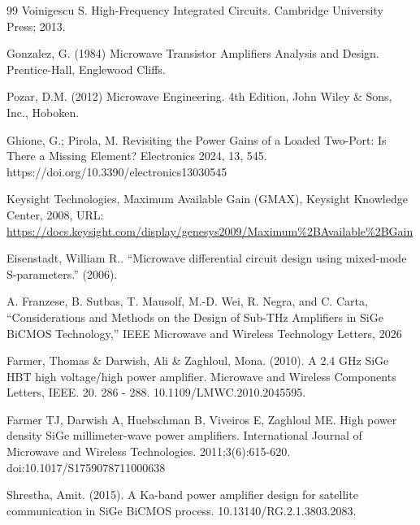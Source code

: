 \begin{thebibliography}{99}
Voinigescu S. High-Frequency Integrated Circuits. Cambridge University Press; 2013.

Gonzalez, G. (1984) Microwave Transistor Amplifiers Analysis and Design. Prentice-Hall, Englewood Cliffs.

Pozar, D.M. (2012) Microwave Engineering. 4th Edition, John Wiley & Sons, Inc., Hoboken.

Ghione, G.; Pirola, M. Revisiting the Power Gains of a Loaded Two-Port: Is There a Missing Element? Electronics 2024, 13, 545. https://doi.org/10.3390/electronics13030545

Keysight Technologies, Maximum Available Gain (GMAX), Keysight Knowledge Center, 2008, URL: \url{https://docs.keysight.com/display/genesys2009/Maximum%2BAvailable%2BGain}

Eisenstadt, William R.. “Microwave differential circuit design using mixed-mode S-parameters.” (2006).

 A. Franzese, B. Sutbas, T. Mausolf, M.-D. Wei, R. Negra, and C. Carta, “Considerations and Methods on the Design of Sub-THz Amplifiers in SiGe BiCMOS Technology,” IEEE Microwave and Wireless Technology Letters, 2026


Farmer, Thomas \& Darwish, Ali \& Zaghloul, Mona. (2010). A 2.4 GHz SiGe HBT high voltage/high power amplifier. Microwave and Wireless Components Letters, IEEE. 20. 286 - 288. 10.1109/LMWC.2010.2045595.


Farmer TJ, Darwish A, Huebschman B, Viveiros E, Zaghloul ME. High power density SiGe millimeter-wave power amplifiers. International Journal of Microwave and Wireless Technologies. 2011;3(6):615-620. doi:10.1017/S1759078711000638


Shrestha, Amit. (2015). A Ka-band power amplifier design for satellite communication in SiGe BiCMOS process. 10.13140/RG.2.1.3803.2083. 

\end{thebibliography}
